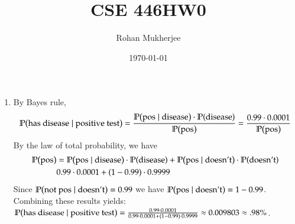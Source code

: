 \documentclass[12pt]{article}
\title{CSE 446HW0}
\date{\today}
\author{Rohan Mukherjee}
\theoremstyle{definitionstyle}
\renewcommand{\P}{\mathbb P\qty}
\begin{document}
	\maketitle
	\begin{enumerate}[leftmargin=\labelsep]
		\item By Bayes rule,
		\begin{align*}
			\P(\text{has disease} \mid \text{positive test}) = \frac{\P(\text{pos} \mid \text{disease}) \cdot \P(\text{disease})}{\P(\text{pos})} = \frac{0.99 \cdot 0.0001}{\P(\text{pos})}
		\end{align*}
		By the law of total probability, we have 
		\begin{align*}
			\P(\text{pos}) &= \P(\text{pos} \mid \text{disease}) \cdot \P(\text{disease}) + \P(\text{pos} \mid \text{doesn't}) \cdot \P(\text{doesn't})
			\\& 0.99 \cdot 0.0001 + (1-0.99) \cdot 0.9999
		\end{align*}
		Since $\P(\text{not pos} \mid \text{doesn't}) = 0.99$ we have $\P(\text{pos} \mid \text{doesn't}) = 1-0.99$. Combining these results yields:
		$\P(\text{has disease} \mid \text{positive test}) = \frac{0.99 \cdot 0.0001}{0.99 \cdot 0.0001 + (1-0.99) \cdot 0.9999} \approx 0.009803 \approx .98\%$.
		

\end{enumerate}
\end{document}
